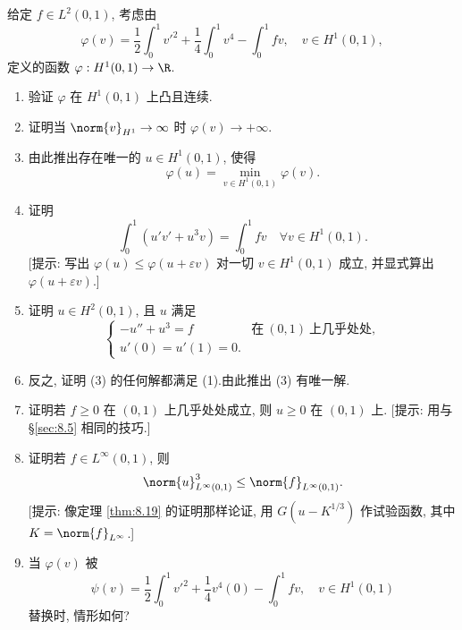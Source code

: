 \begin{exercise}
\label{exer:8.39}
给定 $f\in L^2(0,1)$, 考虑由
\begin{equation*}
\varphi(v)=\frac12\int_0^1v'^2+\frac14\int_0^1v^4-\int_0^1fv,
\quad v\in H^1(0,1),
\end{equation*}
定义的函数 $\varphi:H^1(0,1)\to\R$.
\begin{enumerate}[label=\arabic*., leftmargin=2.2em, itemsep=0.3em]
	\item 验证 $\varphi$ 在 $H^1(0,1)$ 上凸且连续.
	\item 证明当 $\norm{v}_{H^1}\to\infty$ 时 $\varphi(v)\to+\infty$.
	\item 由此推出存在唯一的 $u\in H^1(0,1)$, 使得
	      \begin{equation}
	      \varphi(u)=\min_{v\in H^1(0,1)}\varphi(v).
	      \tag{1}
	      \end{equation}
	\item 证明
	      \begin{equation}
	      \int_0^1(u'v'+u^3v)=\int_0^1fv\quad\forall v\in H^1(0,1).
	      \tag{2}
	      \end{equation}
	      [提示: 写出 $\varphi(u)\le\varphi(u+\varepsilon v)$ 对一切
	      $v\in H^1(0,1)$ 成立, 并显式算出
	      $\varphi(u+\varepsilon v)$.]
	\item 证明 $u\in H^2(0,1)$, 且 $u$ 满足
	      \begin{equation}
	      \begin{cases}
	      -u''+u^3=f & \text{在}\ (0,1)\ \text{上几乎处处},\\
	      u'(0)=u'(1)=0.
	      \end{cases}
	      \tag{3}
	      \end{equation}
	\item 反之, 证明 (3) 的任何解都满足 (1).由此推出 (3) 有唯一解.
	\item 证明若 $f\ge0$ 在 $(0,1)$ 上几乎处处成立, 则 $u\ge0$ 在
	      $(0,1)$ 上.
	      [提示: 用与 \S \ref{sec:8.5} 相同的技巧.]
	\item 证明若 $f\in L^\infty(0,1)$, 则
	      \begin{equation*}
	      \norm{u}_{L^\infty(0,1)}^3\le\norm{f}_{L^\infty(0,1)}.
	      \end{equation*}
	      [提示: 像定理  \ref{thm:8.19} 的证明那样论证, 用
	      $G(u-K^{1/3})$ 作试验函数, 其中 $K=\norm{f}_{L^\infty}$.]
	\item 当 $\varphi(v)$ 被
	      \begin{equation*}
	      \psi(v)=\frac12\int_0^1v'^2+\frac14v^4(0)-\int_0^1fv,
	      \quad v\in H^1(0,1)
	      \end{equation*}
	      替换时, 情形如何?
\end{enumerate}
\end{exercise}

